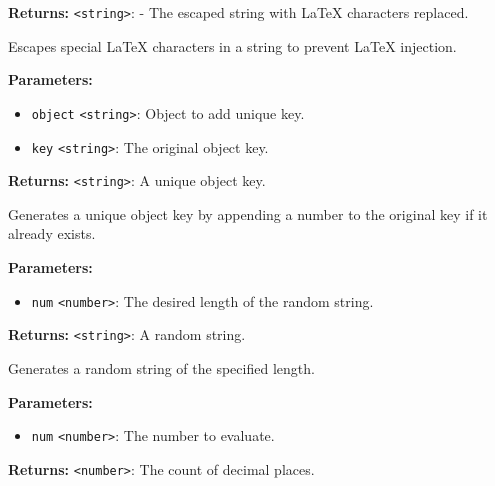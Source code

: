\documentclass[12pt,a4paper]{article}
\begin{document}
\noindent \textbf{Returns:} \texttt{<string>}: - The escaped string with LaTeX characters replaced.

\noindent Escapes special LaTeX characters in a string to prevent LaTeX injection.

\vspace{5mm}
\noindent {}


\noindent \textbf{Parameters:}
\begin{itemize}
  \item \texttt{object} \texttt{<string>}: Object to add unique key.
  \item \texttt{key} \texttt{<string>}: The original object key.
\end{itemize}

\noindent \textbf{Returns:} \texttt{<string>}: A unique object key.

\noindent Generates a unique object key by appending a number to the original key if it already exists.

\vspace{5mm}
\noindent {}


\noindent \textbf{Parameters:}
\begin{itemize}
  \item \texttt{num} \texttt{<number>}: The desired length of the random string.
\end{itemize}

\noindent \textbf{Returns:} \texttt{<string>}: A random string.

\noindent Generates a random string of the specified length.

\vspace{5mm}
\noindent {}


\noindent \textbf{Parameters:}
\begin{itemize}
  \item \texttt{num} \texttt{<number>}: The number to evaluate.
\end{itemize}

\noindent \textbf{Returns:} \texttt{<number>}: The count of decimal places.
\end{document}
